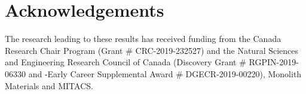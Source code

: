 \section{Acknowledgements}

The research leading to these results has received funding from the Canada Research Chair Program (Grant \# CRC-2019-232527) and the Natural Sciences and Engineering Research Council of Canada (Discovery Grant \# RGPIN-2019-06330 and -Early Career Supplemental Award \# DGECR-2019-00220), Monolith Materials and MITACS.